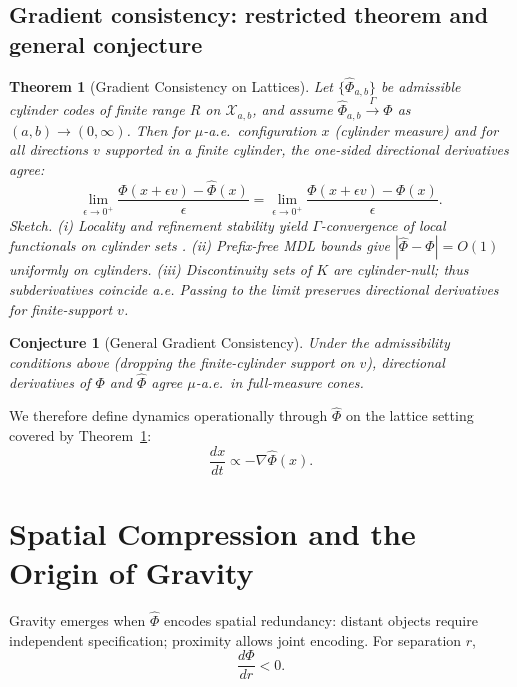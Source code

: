 \documentclass[aps,preprint,onecolumn,longbibliography,nofootinbib]{revtex4-2}
\numberwithin{equation}{section}        %
\newtheorem{theorem}{Theorem}
\newtheorem{conjecture}{Conjecture}
\begin{document}
\subsection{Gradient consistency: restricted theorem and general conjecture}
\begin{theorem}[Gradient Consistency on Lattices]\label{thm:lattice}
Let $\{\widehat\Phi_{a,b}\}$ be admissible cylinder codes of finite range $R$ on $\mathcal X_{a,b}$, and assume $\widehat\Phi_{a,b}\xrightarrow{\Gamma}\widehat\Phi$ as $(a,b)\to (0,\infty)$. Then for $\mu$-a.e.\ configuration $x$ (cylinder measure) and for all directions $v$ supported in a finite cylinder, the one-sided directional derivatives agree:
\begin{equation}
\lim_{\epsilon\to 0^+}\frac{\widehat\Phi(x+\epsilon v)-\widehat\Phi(x)}{\epsilon} = \lim_{\epsilon\to 0^+}\frac{\Phi(x+\epsilon v)-\Phi(x)}{\epsilon}.
\end{equation}
Sketch. (i) Locality and refinement stability yield $\Gamma$-convergence of local functionals on cylinder sets \cite{Braides2002}. (ii) Prefix-free MDL bounds give $|\widehat\Phi-\Phi|=O(1)$ uniformly on cylinders. (iii) Discontinuity sets of $K$ are cylinder-null; thus subderivatives coincide a.e. Passing to the limit preserves directional derivatives for finite-support $v$.
\end{theorem}

\begin{conjecture}[General Gradient Consistency]\label{conj:general}
Under the admissibility conditions above (dropping the finite-cylinder support on $v$), directional derivatives of $\Phi$ and $\widehat\Phi$ agree $\mu$-a.e.\ in full-measure cones.
\end{conjecture}

We therefore define dynamics operationally through $\widehat\Phi$ on the lattice setting covered by Theorem~\ref{thm:lattice}$:$ 
\begin{equation}
\frac{dx}{dt} \propto -\nabla \widehat\Phi(x). \label{eq:dynamics}
\end{equation}

\section{Spatial Compression and the Origin of Gravity}
Gravity emerges when $\widehat\Phi$ encodes spatial redundancy: distant objects require independent specification; proximity allows joint encoding. For separation $r$,
\begin{equation}
\frac{d\Phi}{dr} < 0. \label{eq:dphidr}
\end{equation}
\end{document}
